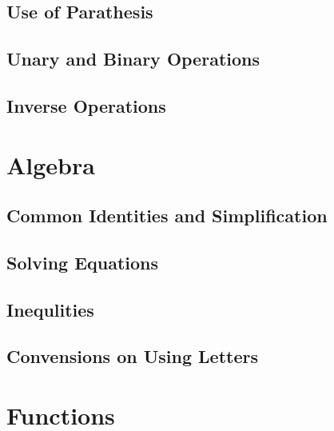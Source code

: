 \documentclass[
]{book}
\theoremstyle{definition}
\theoremstyle{definition}
\theoremstyle{definition}
\theoremstyle{definition}
\theoremstyle{remark}
\begin{document}
\hypertarget{use-of-parathesis}{%
\subsection{Use of Parathesis}\label{use-of-parathesis}}

\hypertarget{unary-and-binary-operations}{%
\subsection{Unary and Binary Operations}\label{unary-and-binary-operations}}

\hypertarget{inverse-operations}{%
\subsection{Inverse Operations}\label{inverse-operations}}

\hypertarget{algebra}{%
\section{Algebra}\label{algebra}}

\hypertarget{common-identities-and-simplification}{%
\subsection{Common Identities and Simplification}\label{common-identities-and-simplification}}

\hypertarget{solving-equations}{%
\subsection{Solving Equations}\label{solving-equations}}

\hypertarget{inequlities}{%
\subsection{Inequlities}\label{inequlities}}

\hypertarget{convensions-on-using-letters}{%
\subsection{Convensions on Using Letters}\label{convensions-on-using-letters}}

\hypertarget{functions}{%
\section{Functions}\label{functions}}
\end{document}
